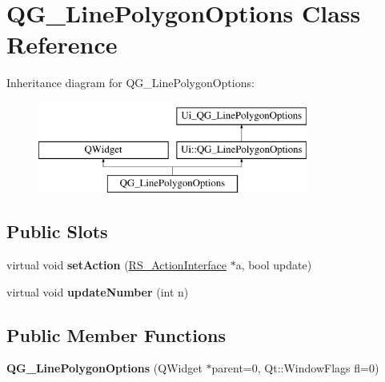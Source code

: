\hypertarget{classQG__LinePolygonOptions}{\section{Q\-G\-\_\-\-Line\-Polygon\-Options Class Reference}
\label{classQG__LinePolygonOptions}
}
Inheritance diagram for Q\-G\-\_\-\-Line\-Polygon\-Options\-:\begin{figure}[H]
\begin{center}
\leavevmode
\includegraphics[height=3.000000cm]{classQG__LinePolygonOptions}
\end{center}
\end{figure}
\subsection*{Public Slots}
\begin{DoxyCompactItemize}
\item 
\hypertarget{classQG__LinePolygonOptions_a8e4a4c16e000839f6c1c6eaf9dc2647f}{virtual void {\bfseries set\-Action} (\hyperlink{classRS__ActionInterface}{R\-S\-\_\-\-Action\-Interface} $\ast$a, bool update)}\label{classQG__LinePolygonOptions_a8e4a4c16e000839f6c1c6eaf9dc2647f}

\item 
\hypertarget{classQG__LinePolygonOptions_ae7cfdefbe1e3a3ee3ba33899c317146a}{virtual void {\bfseries update\-Number} (int n)}\label{classQG__LinePolygonOptions_ae7cfdefbe1e3a3ee3ba33899c317146a}

\end{DoxyCompactItemize}
\subsection*{Public Member Functions}
\begin{DoxyCompactItemize}
\item 
\hypertarget{classQG__LinePolygonOptions_a04c40da8f326137fc5753f9a79be510d}{{\bfseries Q\-G\-\_\-\-Line\-Polygon\-Options} (Q\-Widget $\ast$parent=0, Qt\-::\-Window\-Flags fl=0)}\label{classQG__LinePolygonOptions_a04c40da8f326137fc5753f9a79be510d}

\end{DoxyCompactItemize}
